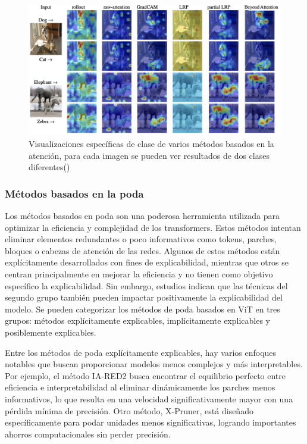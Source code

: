        \begin{figure}[H]
  	\begin{center}
  		\includegraphics[width=1\textwidth]{2/figures/vt4.jpeg}
  		\caption{ Visualizaciones específicas de clase de varios métodos basados en la atención, para cada imagen se pueden ver resultados de dos clases diferentes(\cite{tecnica1})}
  	\end{center}
  \end{figure}
  
\subsubsection{ Métodos basados en la poda} 
Los métodos basados en poda son una poderosa herramienta utilizada para optimizar la eficiencia y complejidad de los transformers. Estos métodos intentan eliminar elementos redundantes o poco informativos como tokens, parches, bloques o cabezas de atención de las redes. Algunos de estos métodos están explícitamente desarrollados con fines de explicabilidad, mientras que otros se centran principalmente en mejorar la eficiencia y no tienen como objetivo específico la explicabilidad. Sin embargo, estudios indican que las técnicas del segundo grupo también pueden impactar positivamente la explicabilidad del modelo. Se pueden categorizar los métodos de poda basados en ViT en tres grupos: métodos explícitamente explicables, implícitamente explicables y posiblemente explicables.

Entre los métodos de poda explícitamente explicables, hay varios enfoques notables que buscan proporcionar modelos menos complejos y más interpretables. Por ejemplo, el método IA-RED2 busca encontrar el equilibrio perfecto entre eficiencia e interpretabilidad al eliminar dinámicamente los parches menos informativos, lo que resulta en una velocidad significativamente mayor con una pérdida mínima de precisión. Otro método, X-Pruner, está diseñado específicamente para podar unidades menos significativas, logrando importantes ahorros computacionales sin perder precisión.

